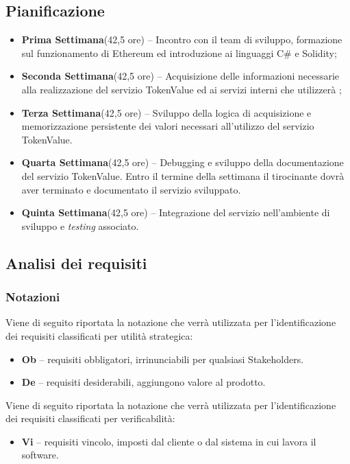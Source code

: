 \documentclass[11pt]{thesistemp}
\begin{document}
\subsection{Pianificazione}

\begin{itemize}
	\item \textbf{Prima Settimana}(42,5 ore) – Incontro con il team di sviluppo, formazione sul funzionamento di Ethereum ed introduzione ai linguaggi C\# e Solidity;
	\item \textbf{Seconda Settimana}(42,5 ore) – Acquisizione delle informazioni necessarie alla realizzazione del servizio TokenValue ed ai servizi interni che utilizzerà ;
	\item \textbf{Terza Settimana}(42,5 ore) – Sviluppo della logica di acquisizione e memorizzazione persistente dei valori necessari all’utilizzo del servizio TokenValue.
	\item \textbf{Quarta Settimana}(42,5 ore) – Debugging e sviluppo della documentazione del servizio TokenValue. Entro il termine della settimana il tirocinante dovrà aver terminato e documentato il servizio sviluppato.
	\item \textbf{Quinta Settimana}(42,5 ore) – Integrazione del servizio nell'ambiente di sviluppo e \textit{testing} associato.
\end{itemize}
\pagebreak

\subsection{Analisi dei requisiti}

\subsubsection{Notazioni}

Viene di seguito riportata la notazione che verrà utilizzata per l’identificazione dei requisiti classificati per utilità strategica: 
\begin{itemize}
	\item \textbf{Ob} – requisiti obbligatori, irrinunciabili per qualsiasi Stakeholders.
	\item \textbf{De} – requisiti desiderabili, aggiungono valore al prodotto.
\end{itemize}
Viene di seguito riportata la notazione che verrà utilizzata per l’identificazione dei requisiti classificati per verificabilità: 
\begin{itemize}
	\item \textbf{Vi} – requisiti vincolo, imposti dal cliente o dal sistema in cui lavora il software.
\end{itemize}
\end{document}
